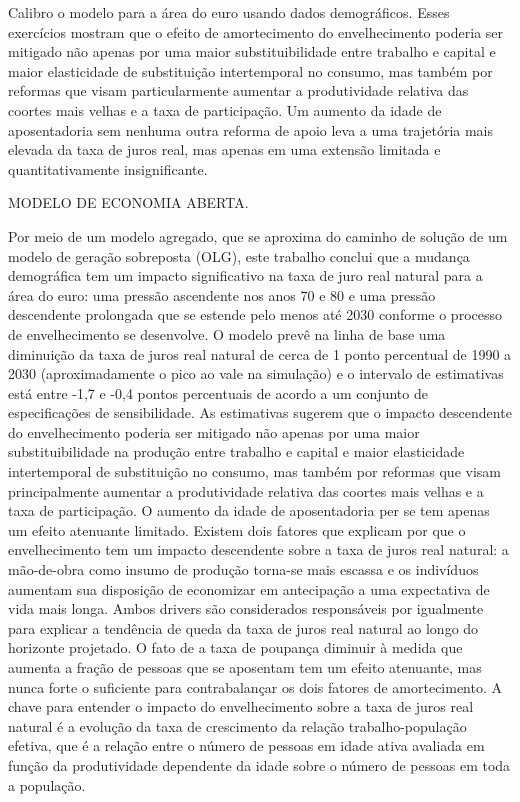 Calibro o modelo para a área do euro usando dados demográficos. Esses exercícios mostram que o efeito de amortecimento do envelhecimento poderia ser mitigado não apenas por uma maior substituibilidade entre trabalho e capital e maior elasticidade de substituição intertemporal no consumo, mas também por reformas que visam particularmente aumentar a produtividade relativa das coortes mais velhas e a taxa de participação. Um aumento da idade de aposentadoria sem nenhuma outra reforma de apoio leva a uma trajetória mais elevada da taxa de juros real, mas apenas em uma extensão limitada e quantitativamente insignificante.

MODELO DE ECONOMIA ABERTA.

Por meio de um modelo agregado, que se aproxima do caminho de solução de um modelo de geração sobreposta (OLG), este trabalho conclui que a mudança demográfica tem um impacto significativo na taxa de juro real natural para a área do euro: uma pressão ascendente nos anos 70 e 80 e uma pressão descendente prolongada que se estende pelo menos até 2030 conforme o processo de envelhecimento se desenvolve. O modelo prevê na linha de base uma diminuição da taxa de juros real natural de cerca de 1 ponto percentual de 1990 a 2030 (aproximadamente o pico ao vale na simulação) e o intervalo de estimativas está entre -1,7 e -0,4 pontos percentuais de acordo a um conjunto de especificações de sensibilidade. As estimativas sugerem que o impacto descendente do envelhecimento poderia ser mitigado não apenas por uma maior substituibilidade na produção entre trabalho e capital
e maior elasticidade intertemporal de substituição no consumo, mas também por reformas que visam principalmente aumentar a produtividade relativa das coortes mais velhas e a taxa de participação. O aumento da idade de aposentadoria per se tem apenas um efeito atenuante limitado. Existem dois fatores que explicam por que o envelhecimento tem um impacto descendente sobre a taxa de juros real natural: a mão-de-obra como insumo de produção torna-se mais escassa e os indivíduos aumentam sua disposição de economizar em antecipação a uma expectativa de vida mais longa. Ambos drivers são considerados responsáveis por
igualmente para explicar a tendência de queda da taxa de juros real natural ao longo do horizonte projetado. O fato de a taxa de poupança diminuir à medida que aumenta a fração de pessoas que se aposentam tem um efeito atenuante, mas nunca forte o suficiente para contrabalançar os dois fatores de amortecimento. A chave para entender o impacto do envelhecimento sobre a taxa de juros real natural é a evolução da taxa de crescimento da relação trabalho-população efetiva, que é a relação entre o número de pessoas em idade ativa avaliada em função da produtividade dependente da idade sobre o número de pessoas em toda a população.
%
%
